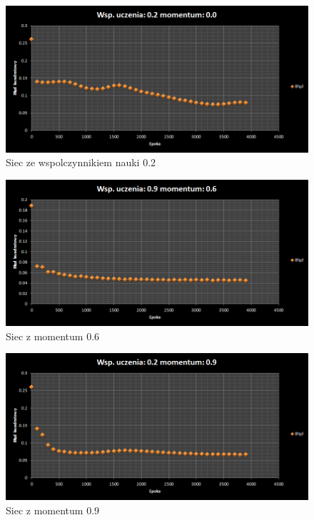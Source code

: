 \documentclass{classrep}
\begin{document}
\begin{figure}[ht]
\centering
			\includegraphics[scale=0.65]{pictures/test05.png}
	\caption{Siec ze wspolczynnikiem nauki 0.2}
	\label{fig:Siec ze wspolczynnikiem nauki 0.2}
\end{figure}

\begin{figure}[ht]
\centering
			\includegraphics[scale=0.65]{pictures/test06.png}
	\caption{Siec z momentum 0.6}
	\label{fig:Siec z momentum 0.6}
\end{figure}

\begin{figure}[ht]
\centering
			\includegraphics[scale=0.65]{pictures/test07.png}
	\caption{Siec z momentum 0.9}
	\label{fig:Siec z momentum 0.9}
\end{figure}
\end{document}
